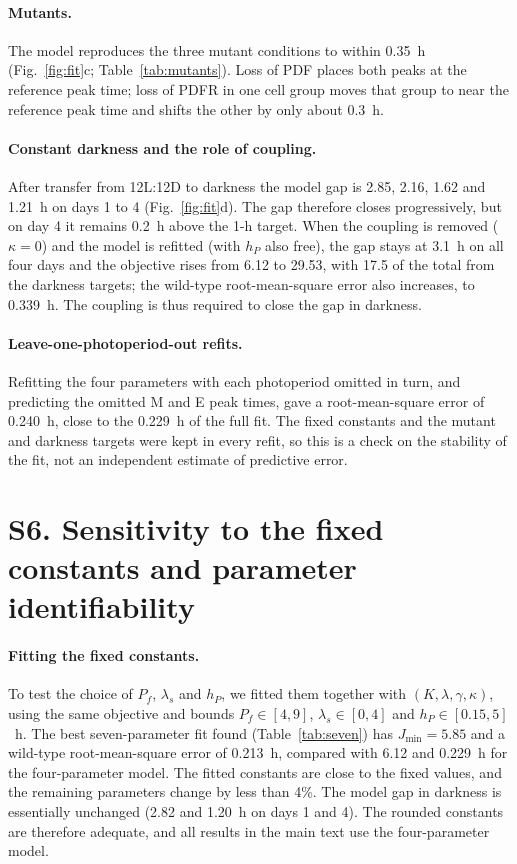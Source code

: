 \documentclass[10pt,a4paper]{article}
\begin{document}
\paragraph{Mutants.}
The model reproduces the three mutant conditions to within 0.35~h
(Fig.~\ref{fig:fit}c; Table~\ref{tab:mutants}). Loss of PDF places both
peaks at the reference peak time; loss of PDFR in one cell group moves
that group to near the reference peak time and shifts the other by only
about 0.3~h.

\paragraph{Constant darkness and the role of coupling.}
After transfer from 12L:12D to darkness the model gap is 2.85, 2.16, 1.62
and 1.21~h on days 1 to 4 (Fig.~\ref{fig:fit}d). The gap therefore closes
progressively, but on day 4 it remains 0.2~h above the 1-h target. When
the coupling is removed ($\kappa=0$) and the model is refitted (with
$h_P$ also free), the gap
stays at 3.1~h on all four days and the objective rises from 6.12 to
29.53, with 17.5 of the total from the darkness targets; the wild-type
root-mean-square error also increases, to 0.339~h. The coupling is thus
required to close the gap in darkness.

\paragraph{Leave-one-photoperiod-out refits.}
Refitting the four parameters with each photoperiod omitted in turn, and
predicting the omitted M and E peak times, gave a root-mean-square error
of 0.240~h, close to the 0.229~h of the full fit. The fixed constants and
the mutant and darkness targets were kept in every refit, so this is a
check on the stability of the fit, not an independent estimate of
predictive error.

\section*{S6. Sensitivity to the fixed constants and parameter
identifiability}
\paragraph{Fitting the fixed constants.}
To test the choice of $P_f$, $\lambda_s$ and $h_P$, we fitted them
together with $(K,\lambda,\gamma,\kappa)$, using the same objective and
bounds $P_f\in[4,9]$, $\lambda_s\in[0,4]$ and $h_P\in[0.15,5]$~h. The
best seven-parameter fit found (Table~\ref{tab:seven}) has
$J_{\min}=5.85$ and a wild-type root-mean-square error of 0.213~h,
compared with 6.12 and 0.229~h for the four-parameter model. The fitted
constants are close to the fixed values, and the remaining parameters
change by less than 4\%. The model gap in darkness is essentially
unchanged (2.82 and 1.20~h on days 1 and 4). The rounded constants are
therefore adequate, and all results in the main text use the
four-parameter model.
\end{document}
